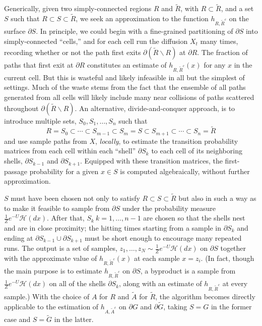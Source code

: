 \documentclass[12pt, nofootinbib,english, amsmath, amssymb, aps, priprint, graphicx,floatfix]{revtex4-1}
\theoremstyle{plain}
\theoremstyle{definition}
\theoremstyle{plain}
\newcommand{\hausdorffmeasure}{\mathscr{H}(dx)}
\begin{document}
Generically, given two simply-connected regions $R$ and $\tilde{R}$, with $R\subset \tilde{R}$, and a set $S$ such that 
$R\subset S  \subset\tilde{R}$, we seek an approximation to 
the function $h_{R,\tilde{R}^c}$ on the surface $\partial S$. In principle, we could begin with a fine-grained partitioning of $\partial S$ into simply-connected ``cells,'' and for each cell run the diffusion $X_t$ many times, recording whether or not the path first exits $\partial (\tilde{R}\backslash R)$ at $\partial R$. The fraction of paths that first exit at $\partial R$ constitutes an estimate of 
$h_{R,\tilde{R}^c}(x)$ for any $x$ in the current cell. But this is wasteful and likely infeasible in all but the simplest of settings. Much of the waste stems from the fact that the ensemble of all paths generated from all cells will likely include many near collisions of paths scattered throughout $\partial (\tilde{R}\backslash R)$. An alternative, divide-and-conquer  approach, is to introduce multiple sets, $S_0,S_1,\ldots,S_n$ such that 
\begin{equation*}
R=S_0 \subset \cdots \subset S_{m-1}\subset S_m = S \subset S_{m+1} \subset \cdots \subset S_n = \tilde{R}
\end{equation*}
and use sample paths from $X$, {\em locally}, to estimate the transition probability matrices from each cell within each ``shell'' $\partial S_k$ to each cell of its neighboring shells, $\partial S_{k-1}$ and $\partial S_{k+1}$. Equipped with these transition matrices, the first-passage probability for a given $x\in S$ is computed algebraically, without further approximation.  

$S$ must have been chosen not only to satisfy $R\subset S  \subset\tilde{R}$ but also in such a way as to make it feasible to sample from $\partial S$ under the probability measure
$\frac{1}{Z}e^{-U}\hausdorffmeasure$. After that, $S_k\ k=1,\ldots,n-1$ are chosen so that the shells nest and are in close proximity; the hitting times starting from a sample in $\partial
 S_k$ and ending at $\partial S_{k-1} \cup \partial S_{k+1}$ must be short enough to encourage many repeated runs. The output is a set of samples, 
 $z_1,\ldots,z_N \sim \frac{1}{Z}e^{-U}\hausdorffmeasure$ on $\partial S$ together with the approximate value of $h_{R,\tilde{R}^c}(x)$ at each sample $x=z_i$. (In fact, though the main purpose is to estimate $h_{R,\tilde{R}^c}$ on 
 $\partial S$, a byproduct is a sample from $\frac{1}{Z}e^{-U}\hausdorffmeasure$ on all of the shells $\partial S_k$, along with an estimate of $h_{R,\tilde{R}^c}$ at every sample.)
With the choice of $A$ for $R$ and $\tilde A$ for $\tilde R$, the algorithm becomes directly applicable to the estimation of $h_{A, \tilde{A}^c}$ on $\partial G$ and $\partial\tilde{G}$, taking $S=G$ in the former case and $S=\tilde{G}$ in the latter.
 
\end{document}
